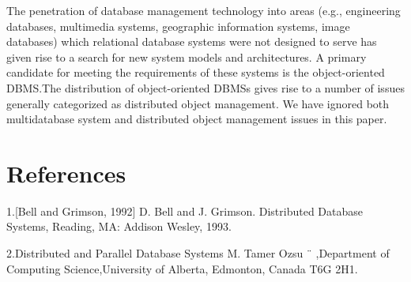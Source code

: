 \documentclass{article}
\begin{document}
The penetration of database management technology into areas (e.g., engineering databases, multimedia systems, geographic information systems, image databases) which relational database systems were not designed to serve has given rise to a search for new system models and architectures. A primary candidate for meeting the requirements of these systems is the object-oriented DBMS.The distribution of object-oriented DBMSs gives rise to a number of issues generally categorized as distributed object management. We have ignored both multidatabase system and distributed object management issues in this paper.

\section{References}
1.[Bell and Grimson, 1992] D. Bell and J. Grimson. Distributed Database Systems, Reading, MA: Addison Wesley, 1993.

2.Distributed and Parallel Database Systems M. Tamer Ozsu ¨
,Department of Computing Science,University of Alberta,
Edmonton, Canada T6G 2H1.
\end{document}
